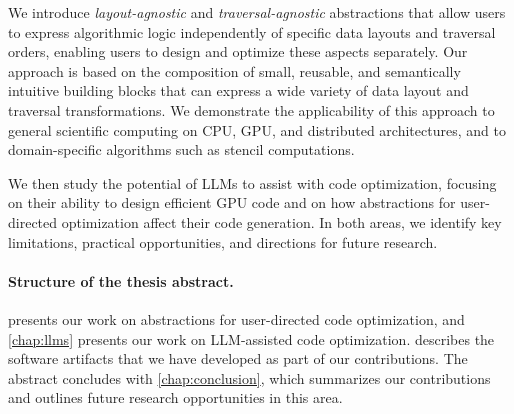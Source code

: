 We introduce \emph{layout-agnostic} and \emph{traversal-agnostic} abstractions that allow users to express algorithmic logic independently of specific data layouts and traversal orders, enabling users to design and optimize these aspects separately.
Our approach is based on the composition of small, reusable, and semantically intuitive building blocks that can express a wide variety of data layout and traversal transformations. We demonstrate the applicability of this approach to general scientific computing on CPU, GPU, and distributed architectures, and to domain-specific algorithms such as stencil computations.

We then study the potential of LLMs to assist with code optimization, focusing on their ability to design efficient GPU code and on how abstractions for user-directed optimization affect their code generation. In both areas, we identify key limitations, practical opportunities, and directions for future research.

\paragraph{Structure of the thesis abstract.}  presents our work on abstractions for user-directed code optimization, and \cref{chap:llms} presents our work on LLM-assisted code optimization.  describes the software artifacts that we have developed as part of our contributions. The abstract concludes with \cref{chap:conclusion}, which summarizes our contributions and outlines future research opportunities in this area.
